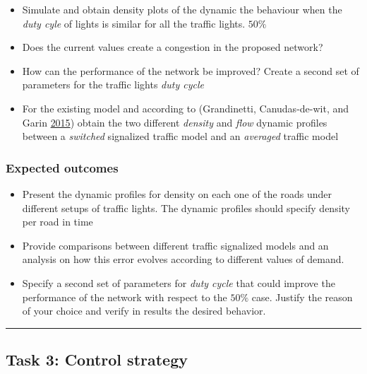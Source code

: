 \documentclass[]{book}
\theoremstyle{definition}
\theoremstyle{definition}
\theoremstyle{definition}
\theoremstyle{remark}
\begin{document}
\begin{itemize}
\item
  Simulate and obtain density plots of the dynamic the behaviour when
  the \emph{duty cyle} of lights is similar for all the traffic lights.
  \(50\%\)
\item
  Does the current values create a congestion in the proposed network?
\item
  How can the performance of the network be improved? Create a second
  set of parameters for the traffic lights \emph{duty cycle}
\item
  For the existing model and according to (Grandinetti, Canudas-de-wit,
  and Garin \protect\hyperlink{ref-Grandinetti2015}{2015}) obtain the
  two different \emph{density} and \emph{flow} dynamic profiles between
  a \emph{switched} signalized traffic model and an \emph{averaged}
  traffic model
\end{itemize}

\hypertarget{expected-outcomes-1}{%
\subsubsection*{Expected outcomes}\label{expected-outcomes-1}}

\begin{itemize}
\item
  Present the dynamic profiles for density on each one of the roads
  under different setups of traffic lights. The dynamic profiles should
  specify density per road in time
\item
  Provide comparisons between different traffic signalized models and an
  analysis on how this error evolves according to different values of
  demand.
\item
  Specify a second set of parameters for \emph{duty cycle} that could
  improve the performance of the network with respect to the \(50\%\)
  case. Justify the reason of your choice and verify in results the
  desired behavior.
\end{itemize}

\begin{center}\rule{0.5\linewidth}{\linethickness}\end{center}

\hypertarget{task-3-control-strategy}{%
\subsection*{Task 3: Control strategy}\label{task-3-control-strategy}}
\end{document}
